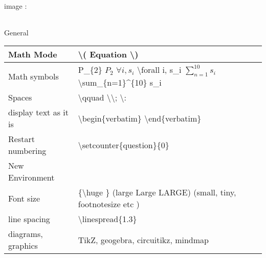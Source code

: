 \begin{enumerate}
     \begin{minipage}{\linewidth}
     \item image :

          \begin{myTableStyle} \begin{tabular}{ |m{14cm}| } \hline
               \\ \hline
          \end{tabular} \end{myTableStyle} \vspace{0.08in}
     \end{minipage}

     \item   General

          \begin{myTableStyle} \begin{tabular}{ |m{4cm}|m{10cm}| } \hline
               Math Mode    &  \textbackslash ( Equation \textbackslash ) \\ \hline
               Math symbols &  P\_\{2\} \(P_{2}\)  \quad
                               \( \forall i, s_i \)  \textbackslash forall i, s\_i  \qquad
                               \( \sum_{n=1}^{10} s_i \)   \textbackslash sum\_\{n=1\}\textasciicircum\{10\} s\_i        \\ \hline

               Spaces  & \textbackslash qquad  \qquad \textbackslash \qquad \textbackslash ; \qquad \textbackslash : \\ \hline

               display text as it is    &    \textbackslash begin\{verbatim\}  \textbackslash end\{verbatim\}     \\ \hline

               Restart numbering &  \textbackslash setcounter\{question\}\{0\} \\ \hline

               New Environment &   \\ \hline

               Font size &  \{\textbackslash huge \}   (large Large LARGE) (small, tiny, footnotesize etc ) \\ \hline

               line spacing & \textbackslash linespread\{1.3\} \\ \hline

               diagrams, graphics       &    TikZ, geogebra, circuitikz, mindmap     \\ \hline
          \end{tabular} \end{myTableStyle} \vspace{0.08in}


\end{enumerate}

